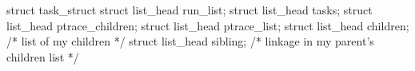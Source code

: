 \documentclass[varwidth=35.5em,crop]{standalone}
\begin{document}
\begin{ccode}
struct task_struct {
  struct list_head run_list;
  struct list_head tasks;
  struct list_head ptrace_children;
  struct list_head ptrace_list;
  struct list_head children; /* list of my children */
  struct list_head sibling;  /* linkage in my parent's children list */
}  
\end{ccode}
\end{document}
